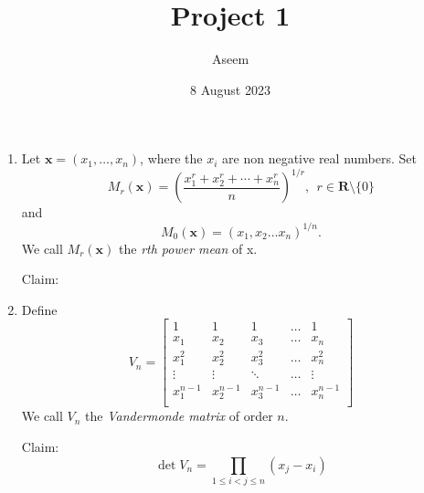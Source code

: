 \documentclass{article}
\title{Project 1}
\author{Aseem}
\date{8 August 2023}
\begin{document}
\maketitle

\begin{enumerate}
    \item Let $\mathbf{x}=(x_1,\ldots,x_n)$, where the $x_i$ are non negative real numbers.
    Set \[
    M_r (\mathbf{x}) = \left(\frac{x_1^r+x_2^r +\cdots+x_n^r}{n}\right)^{1/r},
    \: \: r \in \mathbf{R} \setminus \{0\} 
    \]
    and \[
    M_0(\mathbf{x})=\left(x_1, x_2 \ldots x_n \right)^{1/n}.
    \]
    We call $M_r(\mathbf{x})$ the \emph{rth power mean} of x.
    
    Claim:
    \item Define \[
    V_n = \left[
    \begin{array}{ccccc}
    1 & 1& 1& \ldots & 1 \\
    x_1 & x_2& x_3& \ldots & x_n\\
    x_1^2 & x_2^2& x_3^2& \ldots & x_n^2\\
    \vdots & \vdots& \ddots& \ldots & \vdots \\
    x_1^{n-1} & x_2^{n-1}& x_3^{n-1}& \ldots & x_n^{n-1}\\
    \end{array}
    \right]
    \]
    We call $V_n$ the \emph{Vandermonde matrix} of order $n$.
    
    Claim: \[ \det V_n = \prod_{1\leq i <j \leq n}(x_j - x_i)
    \]
\end{enumerate}
\end{document}
